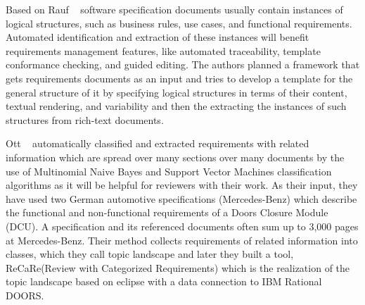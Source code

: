 	Based on Rauf \etal~\cite{Rauf:2011} software specification documents usually contain instances of logical structures, such as business rules, use cases, and functional requirements. Automated identification and extraction of these instances will benefit requirements management features, like automated traceability, template conformance checking, and guided editing. The authors planned a framework that gets requirements documents as an input and tries to develop a template for the general structure of it by specifying logical structures in terms of their content, textual rendering, and variability and then the extracting the instances of such structures from rich-text documents. 

Ott \etal~\cite{Ott:2013} automatically classified and extracted requirements with related information which are spread over many sections over many documents by the use of Multinomial Naive Bayes and Support Vector Machines classification algorithms as it will be helpful for reviewers with their work. As their input, they have used two German automotive specifications (Mercedes-Benz) which describe the functional and non-functional requirements of a Doors Closure Module (DCU). A specification and its referenced documents often sum up to 3,000 pages at Mercedes-Benz. Their method collects requirements of related information into classes, which they call topic landscape and later they built a tool, ReCaRe(Review with Categorized Requirements) which is the realization of the topic landscape based on eclipse with a data connection to IBM Rational DOORS. 





